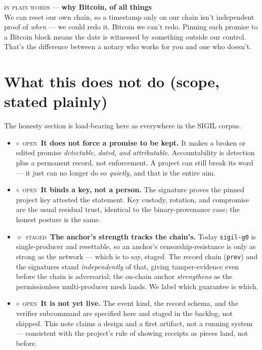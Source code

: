 \documentclass[10pt,a4paper]{article}
\newcommand{\stG}{\textcolor{sigilviolet}{$\diamond$}~{\scriptsize\textcolor{sigilviolet}{\textsc{staged}}}}
\newcommand{\stO}{\textcolor{sigilamber}{$\circ$}~{\scriptsize\textcolor{sigilamber}{\textsc{open}}}}
\newcommand{\layman}[3]{%
\begin{tcolorbox}[enhanced,
  interior style={left color=#1!9,right color=white},
  colframe=#1!45!slate,boxrule=0.5pt,arc=3pt,
  borderline west={2.5pt}{0pt}{#1},
  left=9pt,right=9pt,top=7pt,bottom=7pt]
{\scriptsize\textcolor{#1}{\textsc{in plain words}}\; — \;\textbf{\small #2}}\\[3pt]
\small #3
\end{tcolorbox}}
\begin{document}
\layman{sigilamber}{why Bitcoin, of all things}{We can reset our own chain, so a
timestamp only on our chain isn't independent proof of \emph{when} --- we could redo it.
Bitcoin we can't redo. Pinning each promise to a Bitcoin block means the date is
witnessed by something outside our control. That's the difference between a notary who
works for you and one who doesn't.}

\section{What this does not do (scope, stated plainly)}
The honesty section is load-bearing here as everywhere in the SIGIL corpus.

\begin{itemize}[leftmargin=1.2em,itemsep=3pt]
\item \stO~\textbf{It does not force a promise to be kept.} It makes a broken or
  edited promise \emph{detectable, dated, and attributable}. Accountability is
  detection plus a permanent record, not enforcement. A project can still break its
  word --- it just can no longer do so \emph{quietly}, and that is the entire aim.
\item \stO~\textbf{It binds a key, not a person.} The signature proves the pinned
  project key attested the statement. Key custody, rotation, and compromise are the
  usual residual trust, identical to the binary-provenance case; the honest posture is
  the same.
\item \stG~\textbf{The anchor's strength tracks the chain's.} Today \texttt{sigil-g0}
  is single-producer and resettable, so an anchor's censorship-resistance is only as
  strong as the network --- which is to say, staged. The record chain (\texttt{prev})
  and the signatures stand \emph{independently} of that, giving tamper-evidence even
  before the chain is adversarial; the on-chain anchor \emph{strengthens} as the
  permissionless multi-producer mesh lands. We label which guarantee is which.
\item \stO~\textbf{It is not yet live.} The event kind, the record schema, and the
  verifier subcommand are specified here and staged in the backlog, not shipped. This
  note claims a design and a first artifact, not a running system --- consistent with
  the project's rule of showing receipts as pieces land, not before.
\end{itemize}
\end{document}
